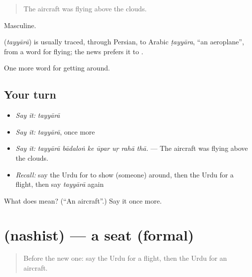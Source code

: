 \begin{quote}
The aircraft was flying above the clouds.
\end{quote}

Masculine.

\begin{cousinweb}
\textbf{} (\emph{tayyārā}) is usually traced, through Persian, to Arabic \emph{ṭayyāra}, \textquotedblleft{}an aeroplane\textquotedblright{}, from a word for flying; the news prefers it to \textbf{ }.
\end{cousinweb}

\begin{grammarlens}[title={What you've built}]
One more word for getting around.
\end{grammarlens}

\subsection*{Your turn}
\begin{itemize}
\raggedright
  \item \emph{Say it:} \emph{tayyārā}
  \item \emph{Say it:} \emph{tayyārā}, once more
  \item \emph{Say it:} \emph{tayyārā bādaloṅ ke ūpar uṛ rahā thā.} — The aircraft was flying above the clouds.
  \item \emph{Recall:} say the Urdu for to show (someone) around, then the Urdu for a flight, then say \emph{tayyārā} again
\end{itemize}

\begin{tcolorbox}[breakable,colback=teal!4,colframe=teal!35!black,title={Before you move on}]
What does  mean? (\textquotedblleft{}An aircraft\textquotedblright{}.) Say it once more.
\end{tcolorbox}
\section[\texorpdfstring{\ur{نشست} (nashist)}{نشست (nashist)}]{ (nashist) — a seat (formal)}

\label{lesson:UR-C398-nashist}



\begin{quote}
Before the new one: say the Urdu for a flight, then the Urdu for an aircraft.
\end{quote}

